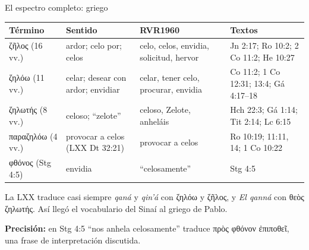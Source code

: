 \documentclass[hyperref={bookmarks=false},aspectratio=169]{beamer}
\newcommand{\grc}[1]{\foreignlanguage{ancientgreek}{#1}}
\newcommand{\precision}[1]{{\footnotesize\color{gris}\textbf{Precisión:} #1}}
\begin{document}
\begin{frame}{El espectro completo: griego}
\scriptsize\renewcommand{\arraystretch}{1.12}
\begin{tabular}{@{}>{\RaggedRight\arraybackslash}p{2.5cm}>{\RaggedRight\arraybackslash}p{3.0cm}>{\RaggedRight\arraybackslash}p{3.0cm}>{\RaggedRight\arraybackslash}p{3.3cm}@{}}
\toprule
\textbf{Término} & \textbf{Sentido} & \textbf{RVR1960} & \textbf{Textos} \\ \midrule
\grc{ζῆλος} (16 vv.) & ardor; celo por; celos & celo, celos, envidia, solicitud, hervor & Jn 2:17; Ro 10:2; 2 Co 11:2; He 10:27 \\
\grc{ζηλόω} (11 vv.) & celar; desear con ardor; envidiar & celar, tener celo, procurar, envidia & 2 Co 11:2; 1 Co 12:31; 13:4; Gá 4:17--18 \\
\grc{ζηλωτής} (8 vv.) & celoso; ``zelote'' & celoso, Zelote, anheláis & Hch 22:3; Gá 1:14; Tit 2:14; Lc 6:15 \\
\grc{παραζηλόω} (4 vv.) & provocar a celos (LXX Dt 32:21) & provocar a celos & Ro 10:19; 11:11, 14; 1 Co 10:22 \\
\grc{φθόνος} (Stg 4:5) & envidia & ``celosamente'' & Stg 4:5 \\
\bottomrule
\end{tabular}\par\medskip
\small\RaggedRight La LXX traduce casi siempre \emph{qaná} y \emph{qin'á} con \grc{ζηλόω} y \grc{ζῆλος}, y \emph{El qanná} con \grc{θεὸς ζηλωτής}. Así llegó el vocabulario del Sinaí al griego de Pablo.\par\smallskip
\precision{en Stg 4:5 ``nos anhela celosamente'' traduce \grc{πρὸς φθόνον ἐπιποθεῖ}, una frase de interpretación discutida.}
\end{frame}
\end{document}
